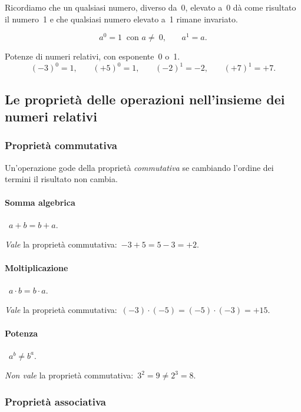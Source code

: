 Ricordiamo che un qualsiasi numero, diverso da~0, elevato a~0 dà come risultato il numero~1 e che qualsiasi
numero elevato a~1 rimane invariato.

\[a^0=1\:\text{ con }a\neq~0\text{,}\qquad a^1=a.\]
\pagebreak
 \begin{exrig}
 \begin{esempio}
 Potenze di numeri relativi, con esponente~0 o~1.
\[(-3)^0=1\text{,}\qquad (+5)^0=1\text{,}\qquad (-2)^1=-2\text{,}\qquad (+7)^1=+7.\]
 \end{esempio}

\end{exrig}

\ovalbox{\risolvii \ref{ese:2.22}, \ref{ese:2.23}, \ref{ese:2.24}, \ref{ese:2.25}, \ref{ese:2.26}, \ref{ese:2.27}}

\subsection{Le proprietà delle operazioni nell'insieme dei numeri relativi}
\subsubsection{Proprietà commutativa}

Un'operazione gode della proprietà \emph{commutativa} se cambiando l'ordine dei termini il risultato non cambia.
\paragraph{Somma algebrica}~$a+b=b+a$.

\emph{Vale} la proprietà commutativa:~$-3+5=5-3=+2$.

\paragraph{Moltiplicazione}~$a\cdot b=b\cdot a$.

\emph{Vale} la proprietà commutativa:~$(-3)\cdot(-5)=(-5)\cdot(-3)=+15$.

\paragraph{Potenza}~$a^b\neq b^a$.

\emph{Non vale} la proprietà commutativa:~$3^2=9\neq2^3=8$.


\subsubsection{Proprietà associativa}


